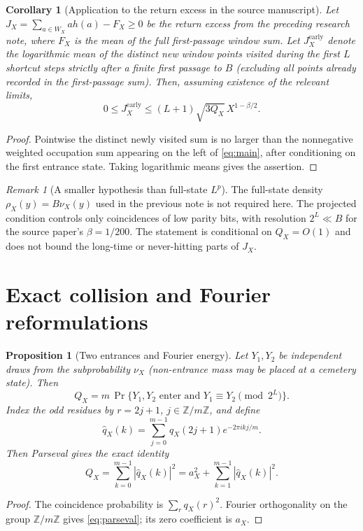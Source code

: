 \documentclass[11pt]{amsart}
\newtheorem{corollary}{Corollary}
\newtheorem{proposition}{Proposition}
\theoremstyle{remark}
\newtheorem{remark}{Remark}
\newcommand{\1}{\mathbf1}
\begin{document}
\begin{corollary}[Application to the return excess in the source manuscript]
Let $J_X=\sum_{a\in W_X}a h(a)-F_X\ge0$ be the return excess from the preceding research note, where $F_X$ is the mean of the full first-passage window sum.  Let $J_X^{\mathrm{early}}$ denote the logarithmic mean of the \emph{distinct} new window points visited during the first $L$ shortcut steps strictly after a finite first passage to $B$ (excluding all points already recorded in the first-passage sum). Then, assuming existence of the relevant limits,
\[
 0\le J_X^{\mathrm{early}}
 \le (L+1)\sqrt{3Q_X}\,X^{1-\beta/2}.
\]
\end{corollary}
\begin{proof}
Pointwise the distinct newly visited sum is no larger than the nonnegative weighted occupation sum appearing on the left of \eqref{eq:main}, after conditioning on the first entrance state. Taking logarithmic means gives the assertion.
\end{proof}

\begin{remark}[A smaller hypothesis than full-state $L^p$]
The full-state density $\rho_X(y)=B\nu_X(y)$ used in the previous note is not required here. The projected condition controls only coincidences of low parity bits, with resolution $2^L\ll B$ for the source paper's $\beta=1/200$. The statement is conditional on $Q_X=O(1)$ and does not bound the long-time or never-hitting parts of $J_X$.
\end{remark}

\section{Exact collision and Fourier reformulations}
\begin{proposition}[Two entrances and Fourier energy]\label{prop:fourier}
Let $Y_1,Y_2$ be independent draws from the subprobability $\nu_X$ (non-entrance mass may be placed at a cemetery state). Then
\[
 \boxed{Q_X=m\,\Pr\{Y_1,Y_2\text{ enter and }Y_1\equiv Y_2\pmod{2^L}\}.}
\]
Index the odd residues by $r=2j+1$, $j\in\mathbb Z/m\mathbb Z$, and define
\[
 \widehat q_X(k)=\sum_{j=0}^{m-1}q_X(2j+1)e^{-2\pi i kj/m}.
\]
Then Parseval gives the exact identity
\begin{equation}\label{eq:parseval}
 \boxed{Q_X=\sum_{k=0}^{m-1}|\widehat q_X(k)|^2
 =a_X^2+\sum_{k=1}^{m-1}|\widehat q_X(k)|^2.}
\end{equation}
\end{proposition}
\begin{proof}
The coincidence probability is $\sum_rq_X(r)^2$. Fourier orthogonality on the group $\mathbb Z/m\mathbb Z$ gives \eqref{eq:parseval}; its zero coefficient is $a_X$.
\end{proof}
\end{document}
